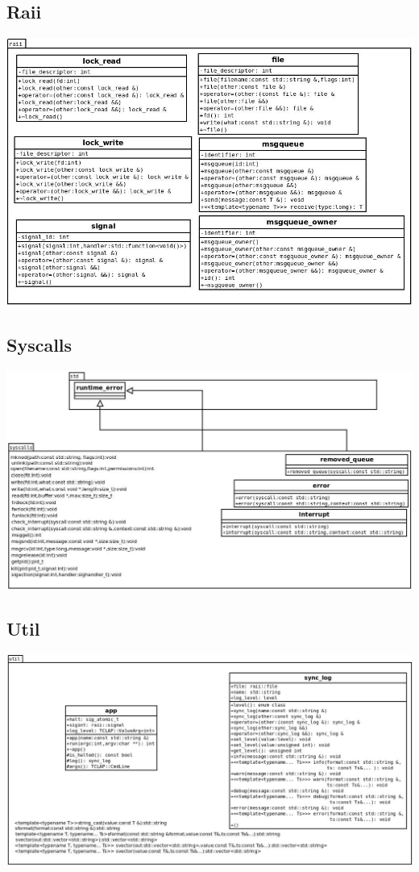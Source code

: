 \documentclass[a4paper,10pt]{article}
\begin{document}
    \subsection{Raii}
	\begin{center}
        \includegraphics[scale=0.8]{raii.png}
    \end{center}
    
    \subsection{Syscalls}
	\begin{center}
        \includegraphics[scale=0.8]{syscalls.png}
    \end{center}

    \subsection{Util}
	\begin{center}
    	\includegraphics[scale=0.8]{util.png}
    \end{center}
    
\clearpage

\end{document}
